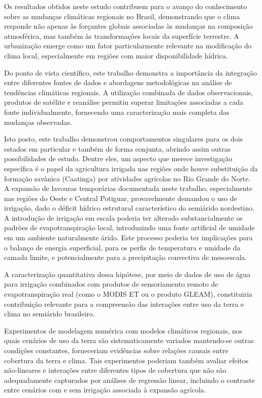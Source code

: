 Os resultados obtidos neste estudo contribuem para o avanço do conhecimento sobre as mudanças climáticas regionais no Brasil, demonstrando que o clima responde não apenas às forçantes globais associadas às mudanças na composição atmosférica, mas também às transformações locais da superfície terrestre. A urbanização emerge como um fator particularmente relevante na modificação do clima local, especialmente em regiões com maior disponibilidade hídrica.

Do ponto de vista científico, este trabalho demonstra a importância da integração entre diferentes fontes de dados e abordagens metodológicas na análise de tendências climáticas regionais. A utilização combinada de dados observacionais, produtos de satélite e reanálise permitiu superar limitações associadas a cada fonte individualmente, fornecendo uma caracterização mais completa das mudanças observadas.

Isto posto, este trabalho demonstrou comportamentos singulares para os dois estados em particular e também de forma conjunta, abrindo assim outras possibilidades de estudo. Dentre eles, um aspecto que merece investigação específica é o papel da agricultura irrigada nas regiões onde houve substituição da formação savânica (Caatinga) por atividades agrícolas no Rio Grande do Norte. A expansão de lavouras temporárias documentada neste trabalho, especialmente nas regiões do Oeste e Central Potiguar, provavelmente demandou o uso de irrigação, dado o déficit hídrico estrutural característico do semiárido nordestino. A introdução de irrigação em escala poderia ter alterado substancialmente os padrões de evapotranspiração local, introduzindo uma fonte artificial de umidade em um ambiente naturalmente árido. Este processo poderia ter implicações para o balanço de energia superficial, para os perfis de temperatura e umidade da camada limite, e potencialmente para a precipitação convectiva de mesoescala. 

A caracterização quantitativa dessa hipótese, por meio de dados de uso de água para irrigação combinados com produtos de sensoriamento remoto de evapotranspiração real (como o MODIS ET ou o produto GLEAM), constituiria contribuição relevante para a compreensão das interações entre uso da terra e clima no semiárido brasileiro.

Experimentos de modelagem numérica com modelos climáticos regionais, nos quais cenários de uso da terra são sistematicamente variados mantendo-se outras condições constantes, forneceriam evidências sobre relações causais entre cobertura da terra e clima. Tais experimentos poderiam também avaliar efeitos não-lineares e interações entre diferentes tipos de cobertura que não são adequadamente capturados por análises de regressão linear, incluindo o contraste entre cenários com e sem irrigação associada à expansão agrícola.

